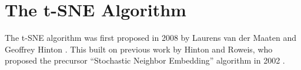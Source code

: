 \chapter{The t-SNE Algorithm}\label{chapter:t-sne}

The t-SNE algorithm was first proposed in 2008 by Laurens van der Maaten and Geoffrey Hinton \cite{vdMaa08}. 
This built on previous work by Hinton and Roweis, who proposed the precursor \enquote{Stochastic Neighbor Embedding} algorithm in 2002 \cite{Hinton02}. 


%
%
